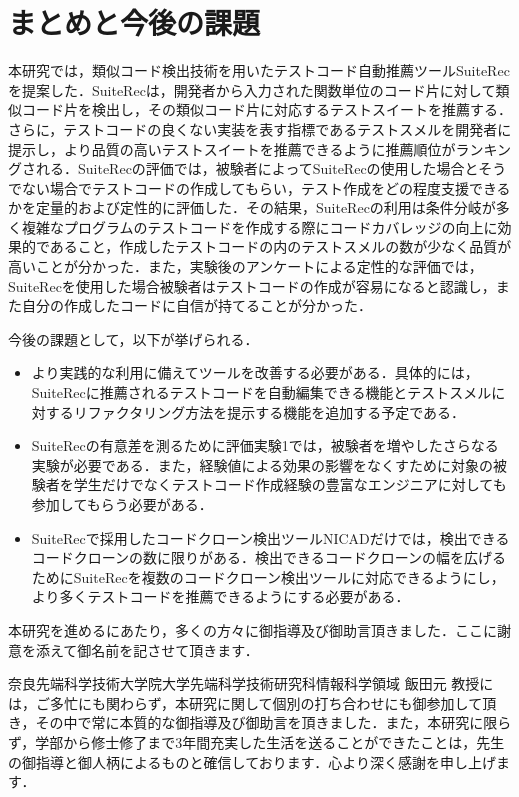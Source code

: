 \documentclass[12pt]{jarticle} %
\begin{document}
\newpage
\section{まとめと今後の課題}
本研究では，類似コード検出技術を用いたテストコード自動推薦ツール{\sf SuiteRec}を提案した．{\sf SuiteRec}は，開発者から入力された関数単位のコード片に対して類似コード片を検出し，その類似コード片に対応するテストスイートを推薦する．さらに，テストコードの良くない実装を表す指標であるテストスメルを開発者に提示し，より品質の高いテストスイートを推薦できるように推薦順位がランキングされる．{\sf SuiteRec}の評価では，被験者によって{\sf SuiteRec}の使用した場合とそうでない場合でテストコードの作成してもらい，テスト作成をどの程度支援できるかを定量的および定性的に評価した．その結果，{\sf SuiteRec}の利用は条件分岐が多く複雑なプログラムのテストコードを作成する際にコードカバレッジの向上に効果的であること，作成したテストコードの内のテストスメルの数が少なく品質が高いことが分かった．また，実験後のアンケートによる定性的な評価では，{\sf SuiteRec}を使用した場合被験者はテストコードの作成が容易になると認識し，また自分の作成したコードに自信が持てることが分かった．

今後の課題として，以下が挙げられる．

\begin{itemize}
\item より実践的な利用に備えてツールを改善する必要がある．具体的には，{\sf SuiteRec}に推薦されるテストコードを自動編集できる機能とテストスメルに対するリファクタリング方法を提示する機能を追加する予定である．
\item {\sf SuiteRec}の有意差を測るために評価実験1では，被験者を増やしたさらなる実験が必要である．また，経験値による効果の影響をなくすために対象の被験者を学生だけでなくテストコード作成経験の豊富なエンジニアに対しても参加してもらう必要がある．
\item {\sf SuiteRec}で採用したコードクローン検出ツールNICADだけでは，検出できるコードクローンの数に限りがある．検出できるコードクローンの幅を広げるために{\sf SuiteRec}を複数のコードクローン検出ツールに対応できるようにし，より多くテストコードを推薦できるようにする必要がある．
\end{itemize}


%
%
\acknowledgements

本研究を進めるにあたり，多くの方々に御指導及び御助言頂きました．ここに謝意を添えて御名前を記させて頂きます．

奈良先端科学技術大学院大学先端科学技術研究科情報科学領域 飯田元 教授には，ご多忙にも関わらず，本研究に関して個別の打ち合わせにも御参加して頂き，その中で常に本質的な御指導及び御助言を頂きました．また，本研究に限らず，学部から修士修了まで3年間充実した生活を送ることができたことは，先生の御指導と御人柄によるものと確信しております．心より深く感謝を申し上げます．
\end{document}
